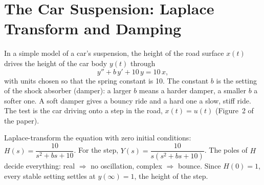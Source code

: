\renewcommand{\teacherTag}{QUESTION 4 \textbullet\ 35 MARKS}
\chapter{The Car Suspension: Laplace Transform and Damping}

\begin{scenario}
In a simple model of a car's suspension, the height of the road surface $x(t)$ drives the height of the car body $y(t)$ through
\[y''+b\,y'+10\,y=10\,x,\]
with units chosen so that the spring constant is 10. The constant $b$ is the setting of the shock absorber (damper): a larger $b$ means a harder damper, a smaller $b$ a softer one. A soft damper gives a bouncy ride and a hard one a slow, stiff ride. The test is the car driving onto a step in the road, $x(t)=u(t)$ (Figure~2 of the paper).
\end{scenario}

\begin{center}
\end{center}

\begin{keyidea}Laplace-transform the equation with zero initial conditions: $H(s)=\dfrac{10}{s^2+bs+10}$. For the step, $Y(s)=\dfrac{10}{s(s^2+bs+10)}$. The poles of $H$ decide everything: real $\Rightarrow$ no oscillation, complex $\Rightarrow$ bounce. Since $H(0)=1$, every stable setting settles at $y(\infty)=1$, the height of the step.\end{keyidea}

